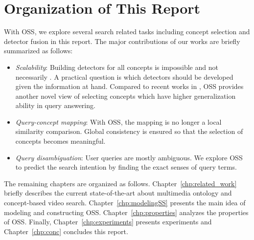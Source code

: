 \section{Organization of This Report}
With OSS, we explore several search related tasks including concept
selection and detector fusion in this report. The major
contributions of our works are briefly summarized as follows:
%
\begin{itemize}
\item
{\em Scalability}: Building detectors for all concepts is impossible
and not necessarily \cite{A.Hauptmann:CIVR:2007,W.H.Lin:ICME:2006}.
A practical question is which detectors should be developed given
the information at hand. Compared to recent works in
\cite{W.H.Lin:ICME:2006}, OSS provides another novel view of
selecting concepts which have higher generalization ability in query
answering.


\item
{\em Query-concept mapping}: With OSS, the mapping is no longer a
local similarity comparison. Global consistency is ensured so that
the selection of concepts becomes meaningful.


\item
{\em Query disambiguation}: User queries are mostly ambiguous. We
explore OSS to predict the search intention by finding the exact
senses of query terms.
\end{itemize}

The remaining chapters are organized as follows.
Chapter~\ref{chp:related_work} briefly describes the current
state-of-the-art about multimedia ontology and concept-based video
search. Chapter~\ref{chp:modelingSS} presents the main idea of
modeling and constructing OSS. Chapter~\ref{chp:properties} analyzes
the properties of OSS. Finally, Chapter~\ref{chp:experiments}
presents experiments and Chapter~\ref{chp:conc} concludes this
report.
